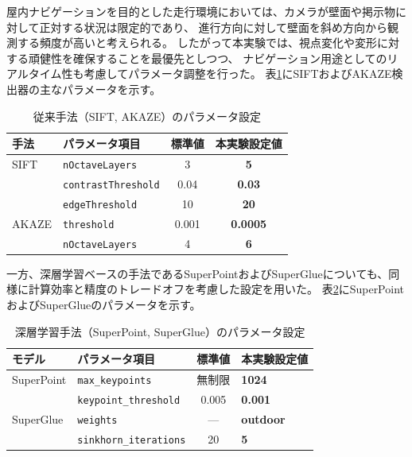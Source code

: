 屋内ナビゲーションを目的とした走行環境においては、カメラが壁面や掲示物に対して正対する状況は限定的であり、
進行方向に対して壁面を斜め方向から観測する頻度が高いと考えられる。
したがって本実験では、視点変化や変形に対する頑健性を確保することを最優先としつつ、
ナビゲーション用途としてのリアルタイム性も考慮してパラメータ調整を行った。
表\ref{five:eight}にSIFTおよびAKAZE検出器の主なパラメータを示す。

\begin{table}[H]
  \centering
  \caption{従来手法（SIFT, AKAZE）のパラメータ設定}
  \label{five:eight}
  \begin{tabular}{l|l|c|c}
    \hline
    手法 & パラメータ項目 & 標準値 & \textbf{本実験設定値} \\
    \hline \hline
    SIFT & \texttt{nOctaveLayers} & 3 & \textbf{5} \\
    & \texttt{contrastThreshold} & 0.04 & \textbf{0.03} \\
    & \texttt{edgeThreshold} & 10 & \textbf{20} \\
    \hline
    AKAZE & \texttt{threshold} & 0.001 & \textbf{0.0005} \\
    & \texttt{nOctaveLayers} & 4 & \textbf{6} \\
    \hline
  \end{tabular}
\end{table}

一方、深層学習ベースの手法であるSuperPointおよびSuperGlueについても、同様に計算効率と精度のトレードオフを考慮した設定を用いた。
表\ref{five:nine}にSuperPointおよびSuperGlueのパラメータを示す。

\begin{table}[H] 
  \centering 
  \caption{深層学習手法（SuperPoint, SuperGlue）のパラメータ設定} 
  \label{five:nine} 
  \begin{tabular}{l|l|c|l} 
    \hline 
    モデル & パラメータ項目 & 標準値 & \textbf{本実験設定値} \\ 
    \hline \hline 
    SuperPoint & \texttt{max\_keypoints} & \mbox{無制限} & \textbf{1024} \\
    & \texttt{keypoint\_threshold} & 0.005 & \textbf{0.001} \\ 
    \hline 
    SuperGlue & \texttt{weights} & --- & \textbf{outdoor} \\ 
    & \texttt{sinkhorn\_iterations} & 20 & \textbf{5} \\
    \hline 
  \end{tabular} 
\end{table}

